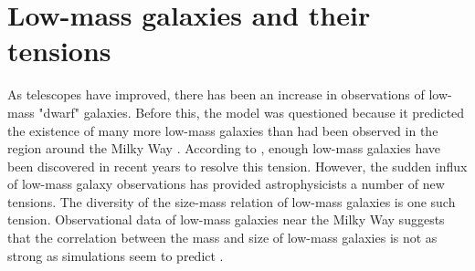 \section{Low-mass galaxies and their tensions}

As telescopes have improved, there has been an increase in observations of low-mass "dwarf" galaxies. Before this, the \lcdm\* model was questioned because it predicted the existence of many more low-mass galaxies than had been observed in the region around the Milky Way \citep{klypinWhereAreMissing1999}. According to \cite{salesBaryonicSolutionsChallenges2022}, enough low-mass galaxies have been discovered in recent years to resolve this tension. However, the sudden influx of low-mass galaxy observations has provided astrophysicists a number of new tensions. The diversity of the size-mass relation of low-mass galaxies is one such tension. Observational data of low-mass galaxies near the Milky Way suggests that the correlation between the mass and size of low-mass galaxies is not as strong as simulations seem to predict \citep{salesBaryonicSolutionsChallenges2022}. 

